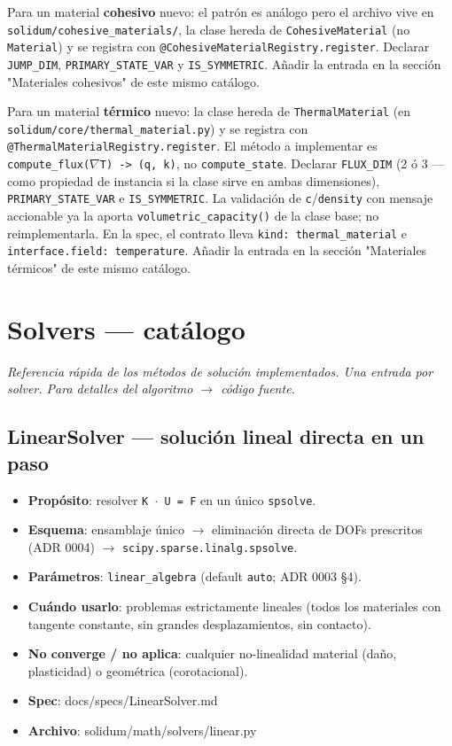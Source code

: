 \documentclass[11pt,letterpaper,oneside]{report}
\begin{document}
Para un material \textbf{cohesivo} nuevo: el patrón es análogo pero el archivo vive en \texttt{solidum/cohesive\_materials/}, la clase hereda de \texttt{CohesiveMaterial} (no \texttt{Material}) y se registra con \texttt{@CohesiveMaterialRegistry.register}. Declarar \texttt{JUMP\_DIM}, \texttt{PRIMARY\_STATE\_VAR} y \texttt{IS\_SYMMETRIC}. Añadir la entrada en la sección "Materiales cohesivos" de este mismo catálogo.

Para un material \textbf{térmico} nuevo: la clase hereda de \texttt{ThermalMaterial} (en \texttt{solidum/core/thermal\_material.py}) y se registra con \texttt{@ThermalMaterialRegistry.register}. El método a implementar es \texttt{compute\_flux(\ensuremath{\nabla}T) -> (q, k)}, no \texttt{compute\_state}. Declarar \texttt{FLUX\_DIM} (2 ó 3 --- como propiedad de instancia si la clase sirve en ambas dimensiones), \texttt{PRIMARY\_STATE\_VAR} e \texttt{IS\_SYMMETRIC}. La validación de \texttt{c}/\texttt{density} con mensaje accionable ya la aporta \texttt{volumetric\_capacity()} de la clase base; no reimplementarla. En la spec, el contrato lleva \texttt{kind: thermal\_material} e \texttt{interface.field: temperature}. Añadir la entrada en la sección "Materiales térmicos" de este mismo catálogo.


\newpage

\chapter{Solvers — catálogo}



\textit{Referencia rápida de los métodos de solución implementados. Una entrada por solver. Para detalles del algoritmo \ensuremath{\to} código fuente.}



\section{LinearSolver --- solución lineal directa en un paso}

\begin{itemize}
  \item \textbf{Propósito}: resolver \texttt{K \ensuremath{\cdot} U = F} en un único \texttt{spsolve}.
  \item \textbf{Esquema}: ensamblaje único \ensuremath{\to} eliminación directa de DOFs prescritos (ADR 0004) \ensuremath{\to} \texttt{scipy.sparse.linalg.spsolve}.
  \item \textbf{Parámetros}: \texttt{linear\_algebra} (default \texttt{auto}; ADR 0003 §4).
  \item \textbf{Cuándo usarlo}: problemas estrictamente lineales (todos los materiales con tangente constante, sin grandes desplazamientos, sin contacto).
  \item \textbf{No converge / no aplica}: cualquier no-linealidad material (daño, plasticidad) o geométrica (corotacional).
  \item \textbf{Spec}: docs/specs/LinearSolver.md
  \item \textbf{Archivo}: solidum/math/solvers/linear.py
\end{itemize}
\end{document}
